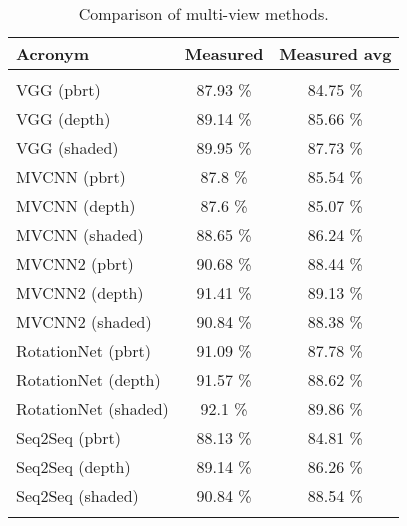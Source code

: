 \begin{table}[]
	\centering
	\begin{tabular}{lcc}
		\hline
		\textbf{Acronym}     & Measured & Measured avg \\ \hline
		                     &          &              \\ 
		VGG (pbrt)           & 87.93 \% &   84.75 \%   \\
		VGG (depth)          & 89.14 \% &   85.66 \%   \\
		VGG (shaded)         & 89.95 \% &   87.73 \%   \\
		MVCNN (pbrt)         & 87.8 \%  &   85.54 \%   \\
		MVCNN (depth)        & 87.6 \%  &   85.07 \%   \\
		MVCNN (shaded)       & 88.65 \% &   86.24 \%   \\
		MVCNN2 (pbrt)        & 90.68 \% &   88.44 \%   \\
		MVCNN2 (depth)       & 91.41 \% &   89.13 \%   \\
		MVCNN2 (shaded)      & 90.84 \% &   88.38 \%   \\
		RotationNet (pbrt)   & 91.09 \% &   87.78 \%   \\
		RotationNet (depth)  & 91.57 \% &   88.62 \%   \\
		RotationNet (shaded) & 92.1 \%  &   89.86 \%   \\
		Seq2Seq  (pbrt)      & 88.13 \% &   84.81 \%   \\
		Seq2Seq  (depth)     & 89.14 \% &   86.26 \%   \\
		Seq2Seq  (shaded)    & 90.84 \% &   88.54 \%   \\
		                     &          &              \\ \hline
	\end{tabular}
\caption{Comparison of multi-view methods.}
\label{Table:mv}
\end{table}